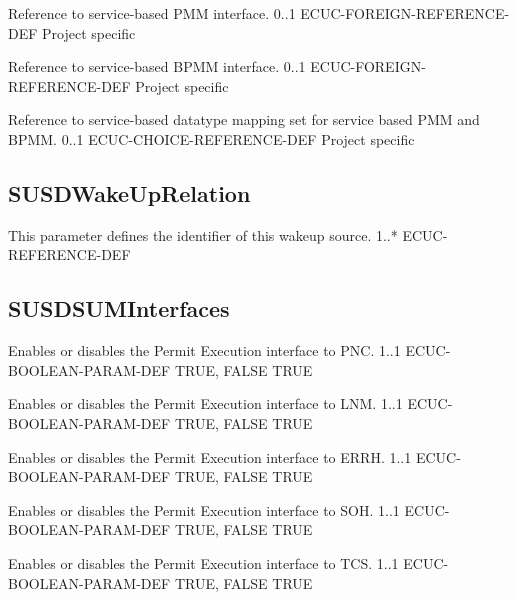 {Reference to service-based PMM interface.}
{0..1}
{ECUC-FOREIGN-REFERENCE-DEF}
{Project specific}
{}

{Reference to service-based BPMM interface.}
{0..1}
{ECUC-FOREIGN-REFERENCE-DEF}
{Project specific}
{}

{Reference to service-based datatype mapping set for service based PMM and BPMM.}
{0..1}
{ECUC-CHOICE-REFERENCE-DEF}
{Project specific}
{}

\subsection{SUSDWakeUpRelation}
\label{subsection:SUSDWake}

{
{This parameter defines the identifier of this wakeup source.}
{1..*}
{ECUC-REFERENCE-DEF}
{}
{}}
{  }

\subsection{SUSDSUMInterfaces}

{
{Enables or disables the Permit Execution interface to PNC.}
{1..1}
{ECUC-BOOLEAN-PARAM-DEF}
{TRUE, FALSE}
{TRUE}}
{ }

{
{Enables or disables the Permit Execution interface to LNM.}
{1..1}
{ECUC-BOOLEAN-PARAM-DEF}
{TRUE, FALSE}
{TRUE}}
{ }

{
{Enables or disables the Permit Execution interface to ERRH.}
{1..1}
{ECUC-BOOLEAN-PARAM-DEF}
{TRUE, FALSE}
{TRUE}}
{ }

{
{Enables or disables the Permit Execution interface to SOH.}
{1..1}
{ECUC-BOOLEAN-PARAM-DEF}
{TRUE, FALSE}
{TRUE}}
{ }

{
{Enables or disables the Permit Execution interface to TCS.}
{1..1}
{ECUC-BOOLEAN-PARAM-DEF}
{TRUE, FALSE}
{TRUE}}
{}

